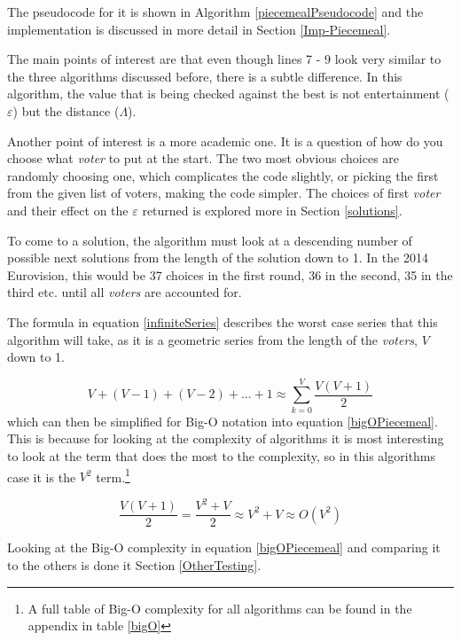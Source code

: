\documentclass[12pt]{report}
\begin{document}
The pseudocode for it is shown in Algorithm \ref{piecemealPseudocode} and the implementation is discussed in more detail in Section \ref{Imp-Piecemeal}.

The main points of interest are that even though lines 7 - 9 look very similar to the three algorithms discussed before, there is a subtle difference. In this algorithm, the value that is being checked against the best is not entertainment ($\varepsilon$) but the distance ($\Lambda$).

Another point of interest is a more academic one. It is a question of how do you choose what \textit{voter} to put at the start. The two most obvious choices are randomly choosing one, which complicates the code slightly, or picking the first from the given list of voters, making the code simpler. The choices of first \textit{voter} and their effect on the $\varepsilon$ returned is explored more in Section \ref{solutions}.

To come to a solution, the algorithm must look at a descending number of possible next solutions from the length of the solution down to 1. In the 2014 Eurovision, this would be 37 choices in the first round, 36 in the second, 35 in the third etc. until all \textit{voters} are accounted for.

The formula in equation \ref{infiniteSeries} describes the worst case series that this algorithm will take, as it is a geometric series from the length of the \textit{voters}, $V$ down to 1.

\begin{equation}\label{infiniteSeries}
	V + (V-1) + (V-2) + ... + 1 \approx \sum_{k=0}^{V} \frac{V(V+1)}{2}
\end{equation}
which can then be simplified for Big-O notation into equation \ref{bigOPiecemeal}. This is because for looking at the complexity of algorithms it is most interesting to look at the term that does the most to the complexity, so in this algorithms case it is the $V^2$ term.\footnote{A full table of Big-O complexity for all algorithms can be found in the appendix in table \ref{bigO}}

\begin{equation}\label{bigOPiecemeal}
	\frac{V(V+1)}{2} = \frac{V^2 + V}{2} \approx V^2 + V \approx O(V^2)
\end{equation}

Looking at the Big-O complexity in equation \ref{bigOPiecemeal} and comparing it to the others is done it Section \ref{OtherTesting}.
\end{document}
